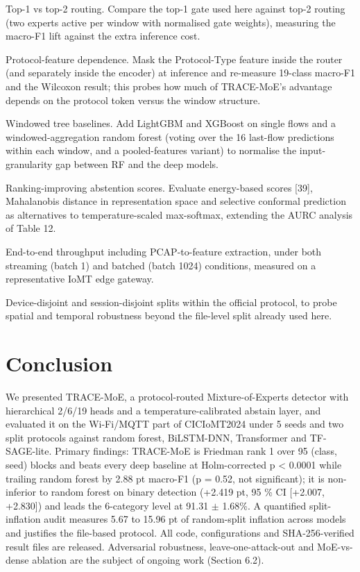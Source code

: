 \documentclass[11pt]{article}
\begin{document}
Top-1 vs top-2 routing. Compare the top-1 gate used here against top-2 routing (two experts active per window with normalised gate weights), measuring the macro-F1 lift against the extra inference cost.

Protocol-feature dependence. Mask the Protocol-Type feature inside the router (and separately inside the encoder) at inference and re-measure 19-class macro-F1 and the Wilcoxon result; this probes how much of TRACE-MoE's advantage depends on the protocol token versus the window structure.

Windowed tree baselines. Add LightGBM and XGBoost on single flows and a windowed-aggregation random forest (voting over the 16 last-flow predictions within each window, and a pooled-features variant) to normalise the input-granularity gap between RF and the deep models.

Ranking-improving abstention scores. Evaluate energy-based scores [39], Mahalanobis distance in representation space and selective conformal prediction as alternatives to temperature-scaled max-softmax, extending the AURC analysis of Table 12.

End-to-end throughput including PCAP-to-feature extraction, under both streaming (batch 1) and batched (batch 1024) conditions, measured on a representative IoMT edge gateway.

Device-disjoint and session-disjoint splits within the official protocol, to probe spatial and temporal robustness beyond the file-level split already used here.

\section{Conclusion}
We presented TRACE-MoE, a protocol-routed Mixture-of-Experts detector with hierarchical 2/6/19 heads and a temperature-calibrated abstain layer, and evaluated it on the Wi-Fi/MQTT part of CICIoMT2024 under 5 seeds and two split protocols against random forest, BiLSTM-DNN, Transformer and TF-SAGE-lite. Primary findings: TRACE-MoE is Friedman rank 1 over 95 (class, seed) blocks and beats every deep baseline at Holm-corrected p < 0.0001 while trailing random forest by 2.88 pt macro-F1 (p = 0.52, not significant); it is non-inferior to random forest on binary detection (+2.419 pt, 95 \% CI [+2.007, +2.830]) and leads the 6-category level at 91.31 $\pm$ 1.68\%. A quantified split-inflation audit measures 5.67 to 15.96 pt of random-split inflation across models and justifies the file-based protocol. All code, configurations and SHA-256-verified result files are released. Adversarial robustness, leave-one-attack-out and MoE-vs-dense ablation are the subject of ongoing work (Section 6.2).
\end{document}
